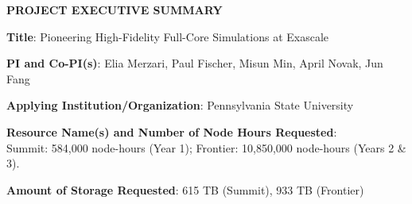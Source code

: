 \documentclass[11pt,letterpaper,english]{article}
\begin{document}
\setlength{\parindent}{0in} %

\pagestyle{fancy}   \renewcommand{%
\headrulewidth}{0.0pt}

\begin{center}
\bf {PROJECT EXECUTIVE SUMMARY} \\
\end{center}




\bigskip

\textbf{Title}: Pioneering High-Fidelity Full-Core Simulations at Exascale \smallskip

\textbf{PI and Co-PI(s)}: Elia Merzari, Paul Fischer, Misun Min, April Novak, Jun Fang \smallskip

\textbf{Applying Institution/Organization}: Pennsylvania State University \smallskip

\textbf{Resource Name(s) and Number of Node Hours Requested}: \\
Summit: 584,000 node-hours (Year 1);
Frontier: 10,850,000 node-hours (Years 2 \& 3).
\smallskip

\textbf{Amount of Storage Requested}: 615 TB (Summit), 933 TB (Frontier) \smallskip
\end{document}
